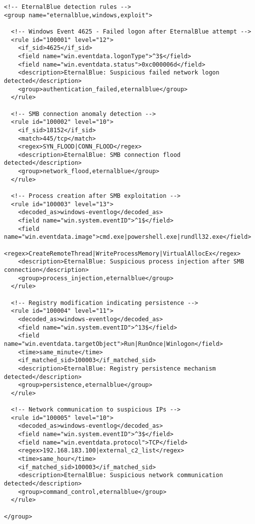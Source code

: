 \begin{lstlisting}[style=xmlstyle,caption=Regles Wazuh pour EternalBlue]
<!-- EternalBlue detection rules -->
<group name="eternalblue,windows,exploit">

  <!-- Windows Event 4625 - Failed logon after EternalBlue attempt -->
  <rule id="100001" level="12">
    <if_sid>4625</if_sid>
    <field name="win.eventdata.logonType">^3$</field>
    <field name="win.eventdata.status">0xc000006d</field>
    <description>EternalBlue: Suspicious failed network logon detected</description>
    <group>authentication_failed,eternalblue</group>
  </rule>

  <!-- SMB connection anomaly detection -->
  <rule id="100002" level="10">  
    <if_sid>18152</if_sid>
    <match>445/tcp</match>
    <regex>SYN_FLOOD|CONN_FLOOD</regex>
    <description>EternalBlue: SMB connection flood detected</description>
    <group>network_flood,eternalblue</group>
  </rule>

  <!-- Process creation after SMB exploitation -->
  <rule id="100003" level="13">
    <decoded_as>windows-eventlog</decoded_as>
    <field name="win.system.eventID">^1$</field>
    <field name="win.eventdata.image">cmd.exe|powershell.exe|rundll32.exe</field>
    <regex>CreateRemoteThread|WriteProcessMemory|VirtualAllocEx</regex>
    <description>EternalBlue: Suspicious process injection after SMB connection</description>
    <group>process_injection,eternalblue</group>
  </rule>

  <!-- Registry modification indicating persistence -->
  <rule id="100004" level="11">
    <decoded_as>windows-eventlog</decoded_as>
    <field name="win.system.eventID">^13$</field>
    <field name="win.eventdata.targetObject">Run|RunOnce|Winlogon</field>
    <time>same_minute</time>
    <if_matched_sid>100003</if_matched_sid>
    <description>EternalBlue: Registry persistence mechanism detected</description>
    <group>persistence,eternalblue</group>
  </rule>

  <!-- Network communication to suspicious IPs -->
  <rule id="100005" level="10">
    <decoded_as>windows-eventlog</decoded_as>
    <field name="win.system.eventID">^3$</field>
    <field name="win.eventdata.protocol">TCP</field>
    <regex>192.168.183.100|external_c2_list</regex>
    <time>same_hour</time>
    <if_matched_sid>100003</if_matched_sid>
    <description>EternalBlue: Suspicious network communication detected</description>
    <group>command_control,eternalblue</group>
  </rule>

</group>
\end{lstlisting}

